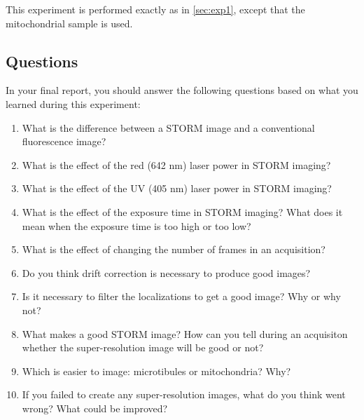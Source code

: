 \documentclass[10pt,a4paper,oneside]{book}
\begin{document}
This experiment is performed exactly as in \autoref{sec:exp1}, except that the mitochondrial sample is used.

\subsection{Questions}\label{sec:questions}

In your final report, you should answer the following questions based on what you learned during this experiment:

\begin{enumerate}
    \item{What is the difference between a STORM image and a conventional fluorescence image?}
    \item{What is the effect of the red (642 nm) laser power in STORM imaging?}
    \item{What is the effect of the UV (405 nm) laser power in STORM imaging?}
    \item{What is the effect of the exposure time in STORM imaging? What does it mean when the exposure time is too high or too low?}
    \item{What is the effect of changing the number of frames in an acquisition?}
    \item{Do you think drift correction is necessary to produce good images?}
    \item{Is it necessary to filter the localizations to get a good image? Why or why not?}
    \item{What makes a good STORM image? How can you tell during an acquisiton whether the super-resolution image will be good or not?}
    \item{Which is easier to image: microtibules or mitochondria? Why?}
    \item{If you failed to create any super-resolution images, what do you think went wrong? What could be improved?}
\end{enumerate}
\end{document}
